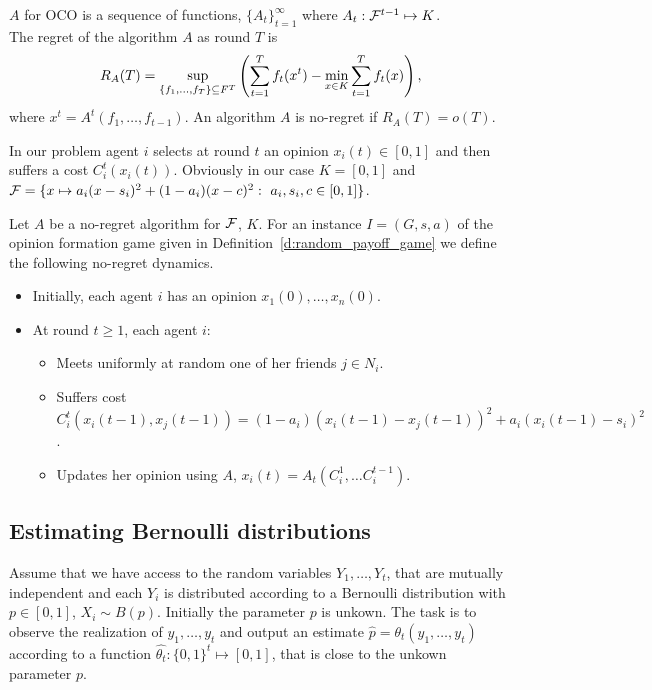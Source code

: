 \begin{definition}\label{d:regret}
  $A$ for OCO is a sequence of functions, $\{A_t\}_{t=1}^{\infty}$ where
  $A_t:\mathcal{F}^{t-1} \mapsto K$.\\
  The regret of the algorithm $A$ as round $T$ is
  \[R_A(T)=\sup_{\{f_1,\ldots ,f_T\}\subseteq F^T}\left(\sum_{t=1}^T f_t(x^t) -
    \min_{x\in K}\sum_{t=1}^T f_t(x)\right),\]
  where $x^t = A^t(f_1,\ldots, f_{t-1})$.
  An algorithm $A$ is no-regret if $R_A(T)=o(T)$.
\end{definition}
In our problem agent $i$ selects at round $t$ an
opinion $x_i(t) \in [0,1]$ and then suffers a cost $C^t_i(x_i(t))$.
Obviously in our case $K=[0,1]$ and
\(
  \mathcal{F} =
  \{
  x \mapsto a_i (x - s_i)^2 + (1-a_i) (x - c)^2:
  \ a_i, s_i, c \in [0,1]
  \}
\).

\begin{definition} \label{d:noregret_dynamics}
  Let $A$ be a no-regret algorithm for $\mathcal{F}$, $K$.
  For an instance $I = (G, s, a)$ of the opinion formation game
  given in Definition~\ref{d:random_payoff_game} we define
  the following no-regret dynamics.
  \begin{itemize}
    \item Initially, each agent $i$ has an opinion $x_1(0),\ldots,x_n(0)$.

    \item At round $t \geq 1$, each agent $i$:
      \begin{itemize}
        \item Meets uniformly at random one of her friends $j \in N_i$.
        \item  Suffers cost
          \(
            C^t_i(x_i(t-1),x_{j}(t-1))=(1-a_i)(x_i(t-1)
            -x_j(t-1))^2 + a_i(x_i(t-1)-s_i)^2
          \).
        \item Updates her opinion using $A$,
          $x_i(t) = A_t(C^1_i, \ldots C^{t-1}_i)$.
      \end{itemize}
  \end{itemize}

\end{definition}

\subsection{Estimating Bernoulli distributions}

Assume that we have access to the random variables $Y_1,\ldots,Y_t$, that are
mutually independent and each
$Y_i$ is distributed according to a Bernoulli distribution with $p \in [0,1]$,
$X_i\sim B(p)$.  Initially the parameter $p$ is unkown. The task is to observe
the realization of $y_1,\ldots,y_t$ and output an estimate
$\hat{p}=\theta_t(y_1,\ldots,y_t)$ according to a function $\hat{\theta_t}:
\{0,1\}^t\mapsto [0,1]$, that is close to the unkown parameter $p$.

